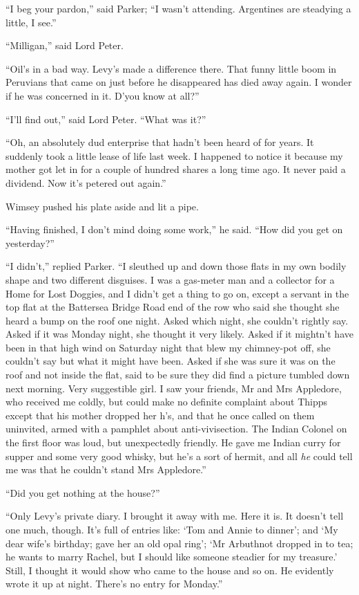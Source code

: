 \enquote{I beg your pardon,} said Parker; \enquote{I wasn’t attending. Argentines are steadying a little, I see.}

\enquote{Milligan,} said Lord Peter.

\enquote{Oil’s in a bad way. Levy’s made a difference there. That funny little boom in Peruvians that came on just before he disappeared has died away again. I wonder if he was concerned in it. D’you know at all?}

\enquote{I’ll find out,} said Lord Peter. \enquote{What was it?}

\enquote{Oh, an absolutely dud enterprise that hadn’t been heard of for years. It suddenly took a little lease of life last week. I happened to notice it because my mother got let in for a couple of hundred shares a long time ago. It never paid a dividend. Now it’s petered out again.}

Wimsey pushed his plate aside and lit a pipe.

\enquote{Having finished, I don’t mind doing some work,} he said. \enquote{How did you get on yesterday?}

\enquote{I didn’t,} replied Parker. \enquote{I sleuthed up and down those flats in my own bodily shape and two different disguises. I was a gas-meter man and a collector for a Home for Lost Doggies, and I didn’t get a thing to go on, except a servant in the top flat at the Battersea Bridge Road end of the row who said she thought she heard a bump on the roof one night. Asked which night, she couldn’t rightly say. Asked if it was Monday night, she thought it very likely. Asked if it mightn’t have been in that high wind on Saturday night that blew my chimney-pot off, she couldn’t say but what it might have been. Asked if she was sure it was on the roof and not inside the flat, said to be sure they did find a picture tumbled down next morning. Very suggestible girl. I saw your friends, Mr and Mrs Appledore, who received me coldly, but could make no definite complaint about Thipps except that his mother dropped her h’s, and that he once called on them uninvited, armed with a pamphlet about anti-vivisection. The Indian Colonel on the first floor was loud, but unexpectedly friendly. He gave me Indian curry for supper and some very good whisky, but he’s a sort of hermit, and all \textit{he} could tell me was that he couldn’t stand Mrs Appledore.}

\enquote{Did you get nothing at the house?}

\enquote{Only Levy’s private diary. I brought it away with me. Here it is. It doesn’t tell one much, though. It’s full of entries like: \enquote{Tom and Annie to dinner}; and \enquote{My dear wife’s birthday; gave her an old opal ring}; \enquote{Mr Arbuthnot dropped in to tea; he wants to marry Rachel, but I should like someone steadier for my treasure.} Still, I thought it would show who came to the house and so on. He evidently wrote it up at night. There’s no entry for Monday.}

